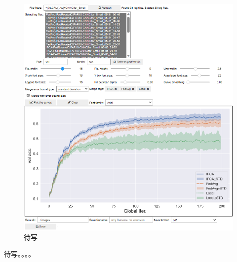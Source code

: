 \begin{figure}[H]
    \centering
    \includegraphics[width=\textwidth]{figures/panel-in-use.png}
    \caption{待写}
    \label{fig:panel-in-use}
\end{figure}

待写。。。。
